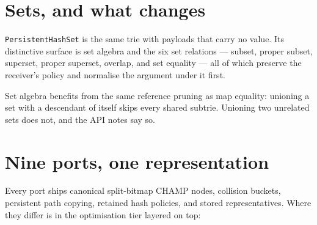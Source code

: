 \documentclass[11pt,twoside,openright]{book}
\newcommand{\code}[1]{\texorpdfstring{\textcolor{d7ink}{\texttt{#1}}}{#1}}
\begin{document}
\section{Sets, and what changes}

\code{PersistentHashSet} is the same trie with payloads that carry no value. Its
distinctive surface is set algebra and the six set relations --- subset, proper
subset, superset, proper superset, overlap, and set equality --- all of which
preserve the receiver's policy and normalise the argument under it first.

Set algebra benefits from the same reference pruning as map equality: unioning a
set with a descendant of itself skips every shared subtrie. Unioning two
unrelated sets does not, and the API notes say so.

\section{Nine ports, one representation}

Every port ships canonical split-bitmap CHAMP nodes, collision buckets,
persistent path copying, retained hash policies, and stored representatives.
Where they differ is in the optimisation tier layered on top:
\end{document}
